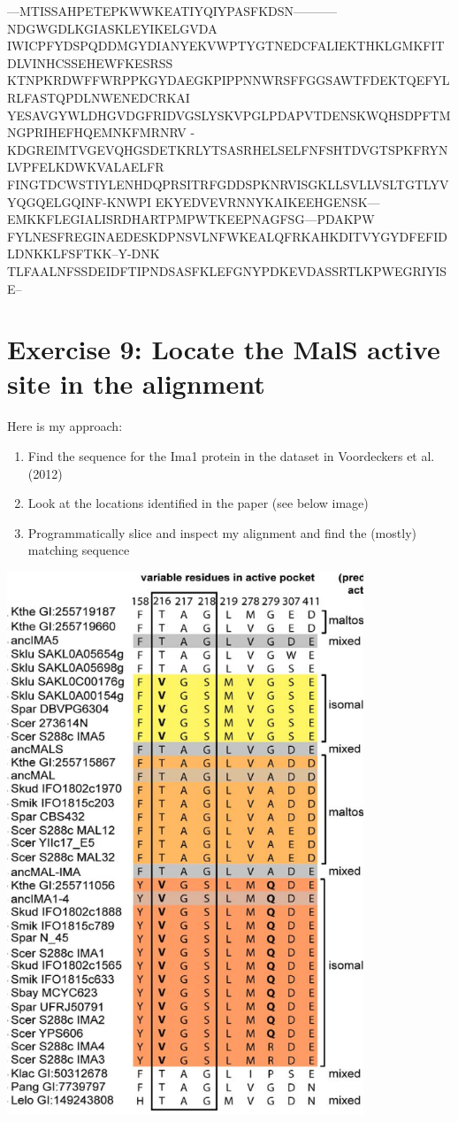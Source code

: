 \documentclass{article} %
\begin{document}
---MTISSAHPETEPKWWKEATIYQIYPASFKDSN-----------NDGWGDLKGIASKLEYIKELGVDA
IWICPFYDSPQDDMGYDIANYEKVWPTYGTNEDCFALIEKTHKLGMKFITDLVINHCSSEHEWFKESRSS
KTNPKRDWFFWRPPKGYDAEGKPIPPNNWRSFFGGSAWTFDEKTQEFYLRLFASTQPDLNWENEDCRKAI
YESAVGYWLDHGVDGFRIDVGSLYSKVPGLPDAPVTDENSKWQHSDPFTMNGPRIHEFHQEMNKFMRNRV
-KDGREIMTVGEVQHGSDETKRLYTSASRHELSELFNFSHTDVGTSPKFRYNLVPFELKDWKVALAELFR
FINGTDCWSTIYLENHDQPRSITRFGDDSPKNRVISGKLLSVLLVSLTGTLYVYQGQELGQINF-KNWPI
EKYEDVEVRNNYKAIKEEHGENSK---EMKKFLEGIALISRDHARTPMPWTKEEPNAGFSG---PDAKPW
FYLNESFREGINAEDESKDPNSVLNFWKEALQFRKAHKDITVYGYDFEFIDLDNKKLFSFTKK--Y-DNK
TLFAALNFSSDEIDFTIPNDSASFKLEFGNYPDKEVDASSRTLKPWEGRIYISE--

\section{Exercise 9: Locate the MalS active site in the alignment}

Here is my approach:

\begin{enumerate}
    \item Find the sequence for the Ima1 protein in the dataset in Voordeckers et al. (2012)
    \item Look at the locations identified in the paper (see below image)
    \item Programmatically slice and inspect my alignment and find the (mostly) matching sequence
\end{enumerate}

\includegraphics[width=0.8\textwidth]{residues.png}
\end{document}
